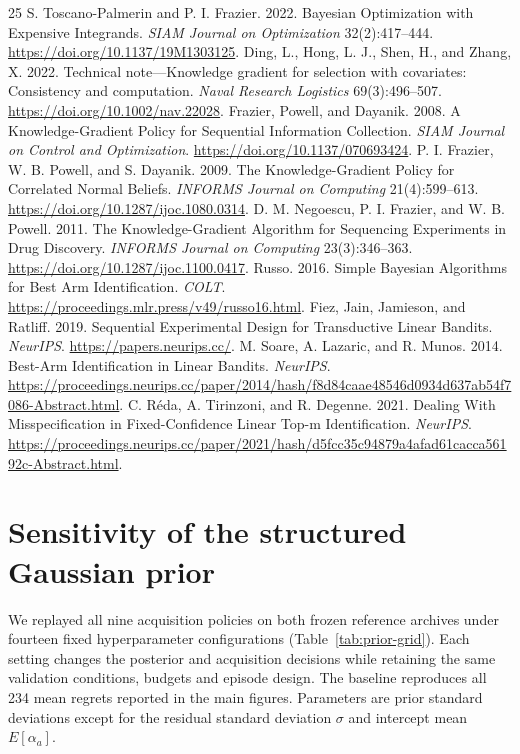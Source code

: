 \documentclass[10pt,a4paper]{article}
\begin{document}
\begin{thebibliography}{25}
 S. Toscano-Palmerin and P. I. Frazier. 2022. Bayesian Optimization with Expensive Integrands. \emph{SIAM Journal on Optimization} 32(2):417--444. \url{https://doi.org/10.1137/19M1303125}.
 Ding, L., Hong, L. J., Shen, H., and Zhang, X. 2022. Technical note---Knowledge gradient for selection with covariates: Consistency and computation. \emph{Naval Research Logistics} 69(3):496--507. \url{https://doi.org/10.1002/nav.22028}.
 Frazier, Powell, and Dayanik. 2008. A Knowledge-Gradient Policy for Sequential Information Collection. \emph{SIAM Journal on Control and Optimization}. \url{https://doi.org/10.1137/070693424}.
 P. I. Frazier, W. B. Powell, and S. Dayanik. 2009. The Knowledge-Gradient Policy for Correlated Normal Beliefs. \emph{INFORMS Journal on Computing} 21(4):599--613. \url{https://doi.org/10.1287/ijoc.1080.0314}.
 D. M. Negoescu, P. I. Frazier, and W. B. Powell. 2011. The Knowledge-Gradient Algorithm for Sequencing Experiments in Drug Discovery. \emph{INFORMS Journal on Computing} 23(3):346--363. \url{https://doi.org/10.1287/ijoc.1100.0417}.
 Russo. 2016. Simple Bayesian Algorithms for Best Arm Identification. \emph{COLT}. \url{https://proceedings.mlr.press/v49/russo16.html}.
 Fiez, Jain, Jamieson, and Ratliff. 2019. Sequential Experimental Design for Transductive Linear Bandits. \emph{NeurIPS}. \url{https://papers.neurips.cc/}.
 M. Soare, A. Lazaric, and R. Munos. 2014. Best-Arm Identification in Linear Bandits. \emph{NeurIPS}. \url{https://proceedings.neurips.cc/paper/2014/hash/f8d84caae48546d0934d637ab54f7086-Abstract.html}.
 C. R\'eda, A. Tirinzoni, and R. Degenne. 2021. Dealing With Misspecification in Fixed-Confidence Linear Top-m Identification. \emph{NeurIPS}. \url{https://proceedings.neurips.cc/paper/2021/hash/d5fcc35c94879a4afad61cacca56192c-Abstract.html}.
\end{thebibliography}

\clearpage
\appendix
\section{Sensitivity of the structured Gaussian prior}
\label{app:prior-sensitivity}
We replayed all nine acquisition policies on both frozen reference archives under
fourteen fixed hyperparameter configurations (Table~\ref{tab:prior-grid}).
Each setting changes the posterior and acquisition decisions while retaining the
same validation conditions, budgets and episode design. The baseline reproduces all
234 mean regrets reported in the main figures. Parameters are prior standard
deviations except for the residual standard deviation $\sigma$ and intercept
mean $E[\alpha_a]$.
\end{document}
